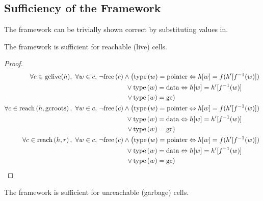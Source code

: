\subsection{Sufficiency of the Framework}
\label{sec:gc-framework-sufficiency}

The framework can be trivially shown correct by substituting values
in.

\begin{lemma}
  The framework is sufficient for reachable (live) cells.
\end{lemma}

\begin{proof}
  \begin{align*}
    \forall c \in \mathrm{gclive}(h),\ \forall w \in c,\ & \lnot\free{c}
      \land \left(\type{w} = \typointer \iff h[w] =
      f(h'[f^{-1}(w)])\right.\\
    &\quad\quad\quad\quad \lor \type{w} = \tydata
    \iff h[w] = h'[f^{-1}(w)]\\
    &\quad\quad\quad\quad \left.\lor\thinspace\type{w} =
      \tygc\right)\\
%
    \forall c \in \reach{h}{\mathrm{gcroots}},\ \forall w \in c,\ &
      \lnot\free{c} \land \left(\type{w} = \typointer \iff
      h[w] = f(h'[f^{-1}(w)])\right.\\
    &\quad\quad\quad\quad \lor \type{w} = \tydata
      \iff h[w] = h'[f^{-1}(w)]\\
    &\quad\quad\quad\quad \left.\lor\thinspace\type{w} =
      \tygc\right)\\
%
    \forall c \in \reach{h}{r},\ \forall w \in c,\ & \lnot\free{c} \land
      \left(\type{w} = \typointer \iff
      h[w] = f(h'[f^{-1}(w)])\right.\\
    &\quad\quad\quad\quad \lor \type{w} = \tydata
      \iff h[w] = h'[f^{-1}(w)]\\
    &\quad\quad\quad\quad \left.\lor\thinspace\type{w} =
      \tygc\right)
\end{align*}
\end{proof}

\begin{lemma}
  The framework is sufficient for unreachable (garbage) cells.
\end{lemma}

